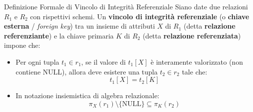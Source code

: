 \documentclass[12pt]{extarticle}
\begin{document}
\begin{cbox}{Definizione Formale di Vincolo di Integrità Referenziale}
\noindent Siano date due relazioni $R_1$ e $R_2$ con rispettivi schemi. Un \textbf{vincolo di integrità referenziale} (o \textbf{chiave esterna} / \textit{foreign key}) tra un insieme di attributi $X$ di $R_1$ (detta \textbf{relazione referenziante}) e la chiave primaria $K$ di $R_2$ (detta \textbf{relazione referenziata}) impone che:
\begin{itemize}
    \item Per ogni tupla $t_1 \in r_1$, se il valore di $t_1[X]$ è interamente valorizzato (non contiene NULL), allora deve esistere una tupla $t_2 \in r_2$ tale che:
    $$t_1[X] = t_2[K]$$
    \item In notazione insiemistica di algebra relazionale:
    $$\pi_X(r_1) \setminus \{ \text{NULL} \} \subseteq \pi_K(r_2)$$
\end{itemize}
\end{cbox}
\end{document}
